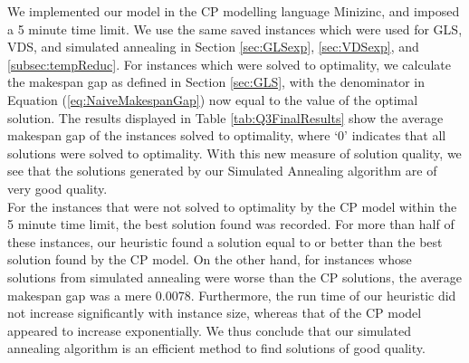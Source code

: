\documentclass[12pt,a4paper,reqno]{article}
\begin{document}
We implemented our model in the CP modelling language Minizinc, and imposed a 5 minute time limit. We use the same saved instances which were used for GLS, VDS, and simulated annealing in Section \ref{sec:GLSexp}, \ref{sec:VDSexp}, and \ref{subsec:tempReduc}. For instances which were solved to optimality, we calculate the makespan gap as defined in Section \ref{sec:GLS}, with the denominator in Equation (\ref{eq:NaiveMakespanGap}) now equal to the value of the optimal solution. The results displayed in Table \ref{tab:Q3FinalResults} show the average makespan gap of the instances solved to optimality, where `0' indicates that all solutions were solved to optimality. With this new measure of solution quality, we see that the solutions generated by our Simulated Annealing algorithm are of very good quality. \\

For the instances that were not solved to optimality by the CP model within the 5 minute time limit, the best solution found was recorded. For more than half of these instances, our heuristic found a solution equal to or better than the best solution found by the CP model. On the other hand, for instances whose solutions from simulated annealing were worse than the CP solutions, the average makespan gap was a mere 0.0078. Furthermore, the run time of our heuristic did not increase significantly with instance size, whereas that of the CP model appeared to increase exponentially. We thus conclude that our simulated annealing algorithm is an efficient method to find solutions of good quality.

\end{document}
